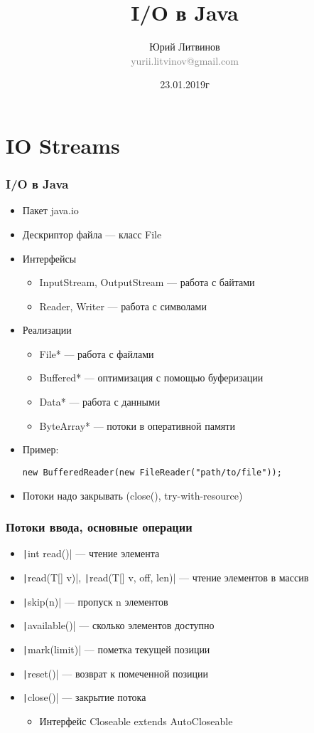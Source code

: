 \documentclass[xetex,mathserif,serif]{beamer}
\title{I/O в Java}
\author[Юрий Литвинов]{Юрий Литвинов\\\small{\textcolor{gray}{yurii.litvinov@gmail.com}}}
\date{23.01.2019г}
\begin{document}
	\frame{\titlepage}

	\section{IO Streams}

	\begin{frame}[fragile]
		\frametitle{I/O в Java}
		\begin{itemize}
			\item Пакет java.io
			\item Дескриптор файла --- класс File
			\item Интерфейсы
			\begin{itemize}
				\item InputStream, OutputStream --- работа с байтами
				\item Reader, Writer --- работа с символами
			\end{itemize}
			\item Реализации
			\begin{itemize}
				\item File* --- работа с файлами
				\item Buffered* --- оптимизация с помощью буферизации
				\item Data* --- работа с данными
				\item ByteArray* --- потоки в оперативной памяти
			\end{itemize}
			\item Пример:
				\begin{verbatim}
new BufferedReader(new FileReader("path/to/file"));
				\end{verbatim}
			\item Потоки надо закрывать (close(), try-with-resource)
		\end{itemize}
	\end{frame}

	\begin{frame}
		\frametitle{Потоки ввода, основные операции}
		\begin{itemize}
			\item \texttt|int read()| --- чтение элемента
			\item \texttt|read(T[] v)|, \texttt|read(T[] v, off, len)| --- чтение элементов в массив
			\item \texttt|skip(n)| --- пропуск n элементов
			\item \texttt|available()| --- сколько элементов доступно
			\item \texttt|mark(limit)| --- пометка текущей позиции
			\item \texttt|reset()| --- возврат к помеченной позиции
			\item \texttt|close()| --- закрытие потока
			\begin{itemize}
				\item Интерфейс Closeable extends AutoCloseable
			\end{itemize}
		\end{itemize}
	\end{frame}
\end{document}
